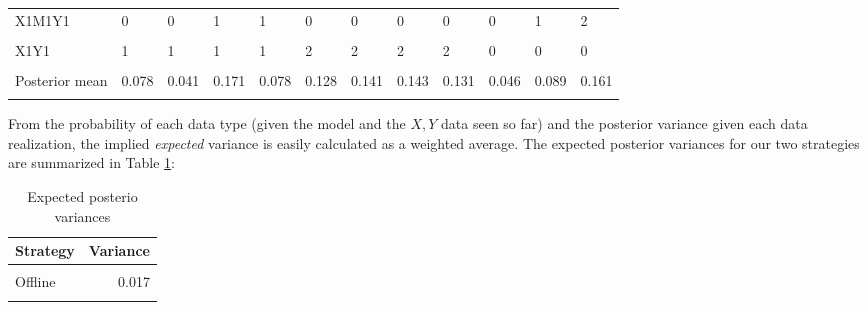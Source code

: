 \documentclass[
  12pt,
]{book}
\begin{document}
\begin{table}
{\begin{tabular}[t]{llllllllllll}
X1M1Y1 & 0 & 0 & 1 & 1 & 0 & 0 & 0 & 0 & 0 & 1 & 2\\
\addlinespace
\cellcolor{gray!6}{X1Y0} & \cellcolor{gray!6}{1} & \cellcolor{gray!6}{1} & \cellcolor{gray!6}{1} & \cellcolor{gray!6}{1} & \cellcolor{gray!6}{0} & \cellcolor{gray!6}{0} & \cellcolor{gray!6}{0} & \cellcolor{gray!6}{0} & \cellcolor{gray!6}{1} & \cellcolor{gray!6}{1} & \cellcolor{gray!6}{1}\\
X1Y1 & 1 & 1 & 1 & 1 & 2 & 2 & 2 & 2 & 0 & 0 & 0\\
\cellcolor{gray!6}{Probability} & \cellcolor{gray!6}{0.171} & \cellcolor{gray!6}{0.03} & \cellcolor{gray!6}{0.625} & \cellcolor{gray!6}{0.174} & \cellcolor{gray!6}{0.27} & \cellcolor{gray!6}{0.231} & \cellcolor{gray!6}{0.23} & \cellcolor{gray!6}{0.268} & \cellcolor{gray!6}{0.09} & \cellcolor{gray!6}{0.242} & \cellcolor{gray!6}{0.668}\\
Posterior mean & 0.078 & 0.041 & 0.171 & 0.078 & 0.128 & 0.141 & 0.143 & 0.131 & 0.046 & 0.089 & 0.161\\
\cellcolor{gray!6}{Posterior variance} & \cellcolor{gray!6}{0.006} & \cellcolor{gray!6}{0.002} & \cellcolor{gray!6}{0.029} & \cellcolor{gray!6}{0.006} & \cellcolor{gray!6}{0.016} & \cellcolor{gray!6}{0.02} & \cellcolor{gray!6}{0.02} & \cellcolor{gray!6}{0.017} & \cellcolor{gray!6}{0.002} & \cellcolor{gray!6}{0.008} & \cellcolor{gray!6}{0.026}\\
\bottomrule
\end{tabular}}
\end{table}

From the probability of each data type (given the model and the \(X,Y\) data seen so far) and the posterior variance given each data realization, the implied \emph{expected} variance is easily calculated as a weighted average. The expected posterior variances for our two strategies are summarized in Table \ref{tab:exppostvar}:

\begin{table}

\caption{\label{tab:exppostvar}Expected posterio variances}
\centering
\begin{tabular}[t]{lr}
\toprule
Strategy & Variance\\
\midrule
\cellcolor{gray!6}{Online} & \cellcolor{gray!6}{0.015}\\
Offline & 0.017\\
\cellcolor{gray!6}{X=1, Y=1} & \cellcolor{gray!6}{0.015}\\
\bottomrule
\end{tabular}
\end{table}
\end{document}
